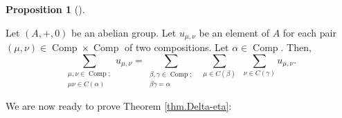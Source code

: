 \documentclass[numbers=enddot,12pt,final,onecolumn,notitlepage]{scrartcl}%
\theoremstyle{definition}
\newtheorem{prop}[theo]{Proposition}
\newenvironment{proposition}[1][]
{\begin{prop}[#1]\begin{leftbar}}
{\end{leftbar}\end{prop}}
\let\sumnonlimits\sum
\renewcommand{\sum}{\sumnonlimits\limits}
\begin{document}
\begin{proposition}
\label{prop.concat.sum=sum}Let $\left(  A,+,0\right)  $ be an abelian group.
Let $u_{\mu,\nu}$ be an element of $A$ for each pair $\left(  \mu,\nu\right)
\in\operatorname*{Comp}\times\operatorname*{Comp}$ of two compositions. Let
$\alpha\in\operatorname*{Comp}$. Then,%
\[
\sum_{\substack{\mu,\nu\in\operatorname*{Comp};\\\mu\nu\in C\left(
\alpha\right)  }}u_{\mu,\nu}=\sum_{\substack{\beta,\gamma\in
\operatorname*{Comp};\\\beta\gamma=\alpha}}\ \ \sum_{\mu\in C\left(
\beta\right)  }\ \ \sum_{\nu\in C\left(  \gamma\right)  }u_{\mu,\nu}.
\]

\end{proposition}

We are now ready to prove Theorem \ref{thm.Delta-eta}:
\end{document}
